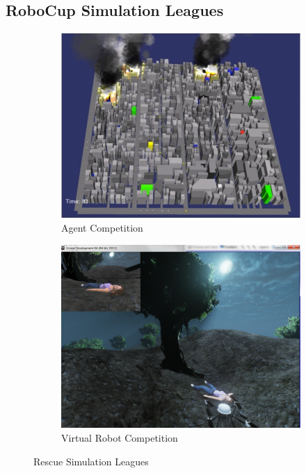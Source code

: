 \subsection{RoboCup Simulation Leagues}
\begin{figure}
  \centering
  \begin{subfigure}[b]{0.48\textwidth}
    \includegraphics[width=\textwidth]{pics/rescue3d}
    \caption{Agent Competition~\cite{rescue3d}}
    \label{fig:rescue_agent_competition}
  \end{subfigure}
  \begin{subfigure}[b]{0.48\textwidth}
    \includegraphics[width=\textwidth]{pics/rescue_vrc}
    \caption{Virtual Robot Competition~\cite{rescue_simulation_league}}
    \label{fig:rescue_vrc}
  \end{subfigure}
  \caption{Rescue Simulation Leagues}
  \label{fig:rescue}
\end{figure}
